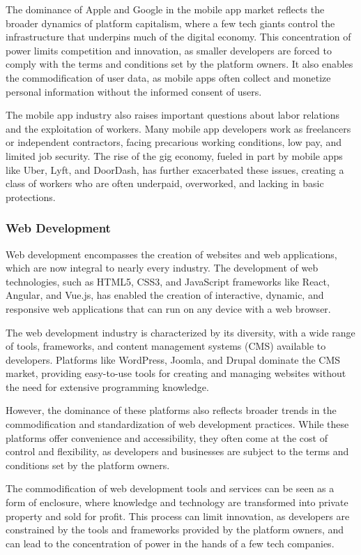 \begin{refsection}
\begin{multicols}{2}
{The dominance of Apple and Google in the mobile app market reflects the broader dynamics of platform capitalism, where a few tech giants control the infrastructure that underpins much of the digital economy. This concentration of power limits competition and innovation, as smaller developers are forced to comply with the terms and conditions set by the platform owners. It also enables the commodification of user data, as mobile apps often collect and monetize personal information without the informed consent of users.

The mobile app industry also raises important questions about labor relations and the exploitation of workers. Many mobile app developers work as freelancers or independent contractors, facing precarious working conditions, low pay, and limited job security. The rise of the gig economy, fueled in part by mobile apps like Uber, Lyft, and DoorDash, has further exacerbated these issues, creating a class of workers who are often underpaid, overworked, and lacking in basic protections.

\subsubsection{Web Development}

Web development encompasses the creation of websites and web applications, which are now integral to nearly every industry. The development of web technologies, such as HTML5, CSS3, and JavaScript frameworks like React, Angular, and Vue.js, has enabled the creation of interactive, dynamic, and responsive web applications that can run on any device with a web browser.

The web development industry is characterized by its diversity, with a wide range of tools, frameworks, and content management systems (CMS) available to developers. Platforms like WordPress, Joomla, and Drupal dominate the CMS market, providing easy-to-use tools for creating and managing websites without the need for extensive programming knowledge.

However, the dominance of these platforms also reflects broader trends in the commodification and standardization of web development practices. While these platforms offer convenience and accessibility, they often come at the cost of control and flexibility, as developers and businesses are subject to the terms and conditions set by the platform owners.

The commodification of web development tools and services can be seen as a form of enclosure, where knowledge and technology are transformed into private property and sold for profit. This process can limit innovation, as developers are constrained by the tools and frameworks provided by the platform owners, and can lead to the concentration of power in the hands of a few tech companies.

}
\end{multicols}
\end{refsection}
